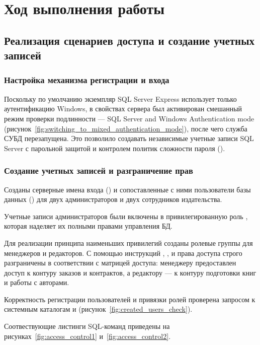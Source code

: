 \newpage
\chapter{Ход выполнения работы}

\section{Реализация сценариев доступа и создание учетных записей}

\subsection{Настройка механизма регистрации и входа}

Поскольку по умолчанию экземпляр SQL Server Express использует только аутентификацию Windows, в свойствах сервера был активирован смешанный режим проверки подлинности --- SQL Server and Windows Authentication mode (рисунок~\ref{fig:switching_to_mixed_authentication_mode}), после чего служба СУБД перезапущена.
Это позволило создавать независимые учетные записи SQL Server с парольной защитой и контролем политик сложности пароля ().

\subsection{Создание учетных записей и разграничение прав}

Созданы серверные имена входа () и сопоставленные с ними пользователи базы данных () для двух администраторов и двух сотрудников издательства.

Учетные записи администраторов были включены в привилегированную роль , которая наделяет их полными правами управления БД.

Для реализации принципа наименьших привилегий созданы ролевые группы для менеджеров и редакторов.
С помощью инструкций , ,  и  права доступа строго разграничены в соответствии с матрицей доступа: менеджеру предоставлен доступ к контуру заказов и контрактов, а редактору --- к контуру подготовки книг и работы с авторами.

Корректность регистрации пользователей и привязки ролей проверена запросом к системным каталогам  и  (рисунок~\ref{fig:created_users_check}).

Соотвествующие листинги SQL-команд приведены на рисунках~\ref{fig:access_control1} и~\ref{fig:access_control2}.

